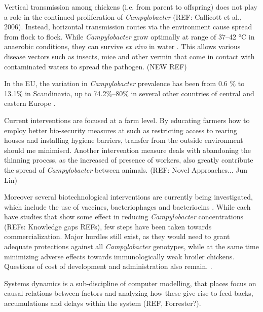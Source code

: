 Vertical transmission among chickens (i.e. from parent to offspring) does not play a role in the continued proliferation of \textit{Campylobacter} (REF: Callicott et al., 2006). Instead, horizontal transmission routes via the environment cause spread from flock to flock. While \textit{Campylobacter} grow optimally at range of 37–42 °C  in anaerobic conditions, they can survive \textit{ex vivo} in water \cite{wilson_tracing_2008}. This allows various disease vectors such as insects, mice and other vermin that come in contact with contaminated waters to spread the pathogen. (NEW REF)

In the EU, the variation in \textit{Campylobacter} prevalence has been from 0.6 \% to 13.1\% in Scandinavia, up to 74.2\%–80\% in several other countries of central and eastern Europe \cite{skarp_campylobacteriosis_2015}.

Current interventions are focused at a farm level. By educating farmers how to employ better bio-security measures at such as restricting access to rearing houses and installing hygiene barriers, transfer from the outside environment should me minimised. Another intervention measure deals with abandoning the thinning process, as the increased of presence of workers, also greatly contribute the spread of \textit{Campylobacter} between animals. (REF: Novel Approaches... Jun Lin) 

Moreover several biotechnological interventions are currently being investigated, which include the use of vaccines, bacteriophages and bacteriocins \parencite{hansson_knowledge_2018}. While each have studies that show some effect in reducing \textit{Campylobacter} concentrations (REFs: Knowledge gaps REFs), few steps have been taken towards commercialization. Major hurdles still exist, as they would need to grant adequate protections against all \textit{Campylobacter} genotypes, while at the same time minimizing adverse effects towards immunologically weak broiler chickens. Questions of cost of development and administration also remain. \parencite{hansson_knowledge_2018}.



Systems dynamics is a sub-discipline of computer modelling, that places focus on causal relations between factors and analyzing how these give rise to feed-backs, accumulations and delays within the system (REF, Forrester?). 

